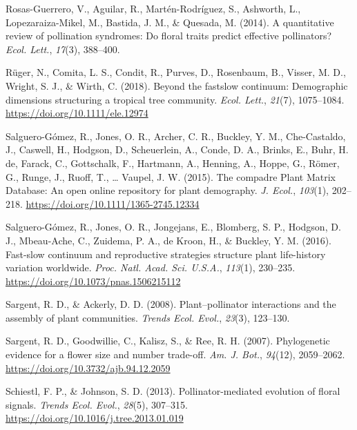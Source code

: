 \documentclass[
  12pt,
  a4paper,
]{article}
\newlength{\cslhangindent}
\newlength{\cslentryspacingunit} %
\newenvironment{CSLReferences}[2] %
 {%
  \setlength{\parindent}{0pt}
  \ifodd #1
  \let\oldpar\par
  \def\par{\hangindent=\cslhangindent\oldpar}
  \fi
  \setlength{\parskip}{#2\cslentryspacingunit}
 }%
 {}
\begin{document}
\begin{CSLReferences}{1}{0}
\leavevmode{}%
Rosas-Guerrero, V., Aguilar, R., Martén-Rodríguez, S., Ashworth, L., Lopezaraiza-Mikel, M., Bastida, J. M., \& Quesada, M. (2014). A quantitative review of pollination syndromes: Do floral traits predict effective pollinators? \emph{Ecol. Lett.}, \emph{17}(3), 388--400.

\leavevmode{}%
Rüger, N., Comita, L. S., Condit, R., Purves, D., Rosenbaum, B., Visser, M. D., Wright, S. J., \& Wirth, C. (2018). Beyond the fast\textendash slow continuum: Demographic dimensions structuring a tropical tree community. \emph{Ecol. Lett.}, \emph{21}(7), 1075--1084. \url{https://doi.org/10.1111/ele.12974}

\leavevmode{}%
Salguero-Gómez, R., Jones, O. R., Archer, C. R., Buckley, Y. M., Che-Castaldo, J., Caswell, H., Hodgson, D., Scheuerlein, A., Conde, D. A., Brinks, E., Buhr, H. de, Farack, C., Gottschalk, F., Hartmann, A., Henning, A., Hoppe, G., Römer, G., Runge, J., Ruoff, T., \ldots{} Vaupel, J. W. (2015). The compadre {Plant Matrix Database}: An open online repository for plant demography. \emph{J. Ecol.}, \emph{103}(1), 202--218. \url{https://doi.org/10.1111/1365-2745.12334}

\leavevmode{}%
Salguero-Gómez, R., Jones, O. R., Jongejans, E., Blomberg, S. P., Hodgson, D. J., Mbeau-Ache, C., Zuidema, P. A., de Kroon, H., \& Buckley, Y. M. (2016). Fast-slow continuum and reproductive strategies structure plant life-history variation worldwide. \emph{Proc. Natl. Acad. Sci. U.S.A.}, \emph{113}(1), 230--235. \url{https://doi.org/10.1073/pnas.1506215112}

\leavevmode{}%
Sargent, R. D., \& Ackerly, D. D. (2008). Plant--pollinator interactions and the assembly of plant communities. \emph{Trends Ecol. Evol.}, \emph{23}(3), 123--130.

\leavevmode{}%
Sargent, R. D., Goodwillie, C., Kalisz, S., \& Ree, R. H. (2007). Phylogenetic evidence for a flower size and number trade-off. \emph{Am. J. Bot.}, \emph{94}(12), 2059--2062. \url{https://doi.org/10.3732/ajb.94.12.2059}

\leavevmode{}%
Schiestl, F. P., \& Johnson, S. D. (2013). Pollinator-mediated evolution of floral signals. \emph{Trends Ecol. Evol.}, \emph{28}(5), 307--315. \url{https://doi.org/10.1016/j.tree.2013.01.019}


\end{CSLReferences}
\end{document}
